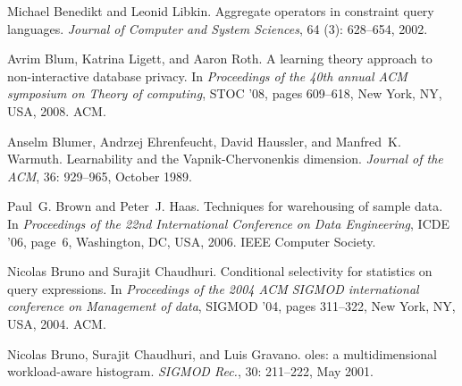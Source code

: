 \begin{thebibliography}{67}
Michael Benedikt and Leonid Libkin.
\newblock Aggregate operators in constraint query languages.
\newblock \emph{Journal of Computer and System Sciences}, 64
  (3): 628--654, 2002.

Avrim Blum, Katrina Ligett, and Aaron Roth.
\newblock A learning theory approach to non-interactive database privacy.
\newblock In \emph{Proceedings of the 40th annual ACM symposium on Theory of
  computing}, STOC '08, pages 609--618, New York, NY, USA, 2008. ACM.

Anselm Blumer, Andrzej Ehrenfeucht, David Haussler, and Manfred~K. Warmuth.
\newblock Learnability and the {V}apnik-{C}hervonenkis dimension.
\newblock \emph{Journal of the ACM}, 36: 929--965, October 1989.

Paul~G. Brown and Peter~J. Haas.
\newblock Techniques for warehousing of sample data.
\newblock In \emph{Proceedings of the 22nd International Conference on Data
  Engineering}, ICDE '06, page~6, Washington, DC, USA, 2006. IEEE Computer
  Society.

Nicolas Bruno and Surajit Chaudhuri.
\newblock Conditional selectivity for statistics on query expressions.
\newblock In \emph{Proceedings of the 2004 ACM SIGMOD international conference
  on Management of data}, SIGMOD '04, pages 311--322, New York, NY, USA, 2004.
  ACM.

Nicolas Bruno, Surajit Chaudhuri, and Luis Gravano.
oles: a multidimensional workload-aware histogram.
\newblock \emph{SIGMOD Rec.}, 30: 211--222, May 2001.


\end{thebibliography}
